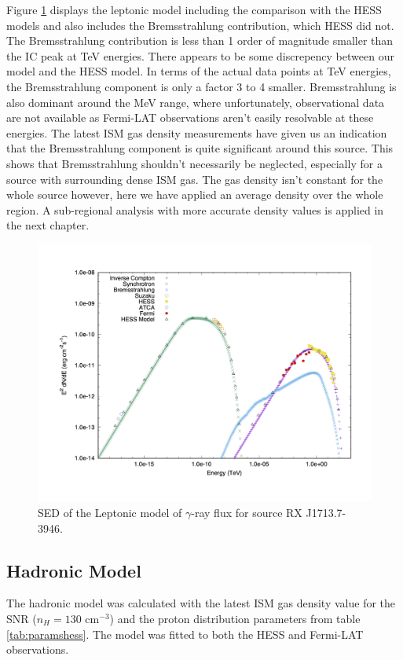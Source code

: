 \documentclass[12pt,a4paper]{article}
\begin{document}
Figure \ref{fig:rxj1713lep} displays the leptonic model including the comparison with the HESS models and also includes the Bremsstrahlung contribution, which HESS did not. The Bremsstrahlung contribution is less than 1 order of magnitude smaller than the IC peak at TeV energies. There appears to be some discrepency between our model and the HESS model. In terms of the actual data points at TeV energies, the Bremsstrahlung component is only a factor 3 to 4 smaller. Bremsstrahlung is also dominant around the MeV range, where unfortunately, observational data are not available as Fermi-LAT observations aren't easily resolvable at these energies. The latest ISM gas density measurements have given us an indication that the Bremsstrahlung component is quite significant around this source. This shows that Bremsstrahlung shouldn't necessarily be neglected, especially for a source with surrounding dense ISM gas. The gas density isn't constant for the whole source however, here we have applied an average density over the whole region. A sub-regional analysis with more accurate density values is applied in the next chapter. 
\begin{figure}[H]
	\centering
	\includegraphics[width=0.45\linewidth, height=0.35\textheight, angle=-90]{rxj1713_lep}
	\caption{SED of the Leptonic model of $\gamma$-ray flux for source RX J1713.7-3946.}
	\label{fig:rxj1713lep}
\end{figure}

\subsection{Hadronic Model}
The hadronic model was calculated with the latest ISM gas density value for the SNR ($n_H = 130$ cm$^{-3}$) and the proton distribution parameters from table \ref{tab:paramshess}. The model was fitted to both the HESS and Fermi-LAT observations. 
\end{document}

